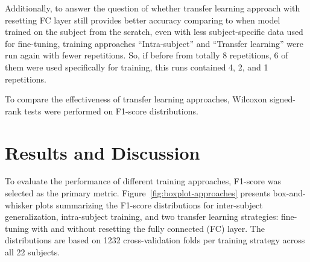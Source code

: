 Additionally, to answer the question of whether transfer learning approach with resetting FC layer still provides better accuracy comparing to when model trained on the subject from the scratch, even with less subject-specific data used for fine-tuning, training approaches ``Intra-subject'' and ``Transfer learning'' were run again with fewer repetitions. So, if before from totally 8 repetitions, 6 of them were used specifically for training, this runs contained 4, 2, and 1 repetitions.

To compare the effectiveness of transfer learning approaches, Wilcoxon signed-rank tests were performed on F1-score distributions.

\section{Results and Discussion}

To evaluate the performance of different training approaches, F1-score was selected as the primary metric. Figure~\ref{fig:boxplot-approaches} presents box-and-whisker plots summarizing the F1-score distributions for inter-subject generalization, intra-subject training, and two transfer learning strategies: fine-tuning with and without resetting the fully connected (FC) layer. The distributions are based on 1232 cross-validation folds per training strategy across all 22 subjects.

